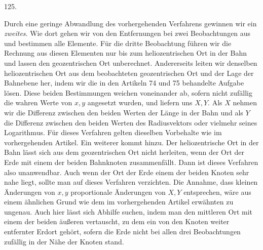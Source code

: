 \par{}\medskip
\begin{center}\hypertarget{native-172-article125}{}125.\end{center}
Durch eine geringe Abwandlung des vorhergehenden Verfahrens gewinnen wir ein \emph{zweites}. Wie dort gehen wir von den Entfernungen bei zwei Beobachtungen aus und bestimmen alle Elemente. Für die dritte Beobachtung führen wir die Rechnung aus diesen Elementen nur bis zum heliozentrischen Ort in der Bahn und lassen den geozentrischen Ort unberechnet. Andererseits leiten wir denselben heliozentrischen Ort aus dem beobachteten geozentrischen Ort und der Lage der Bahnebene her, indem wir die in den Artikeln 74 und 75 behandelte Aufgabe lösen. Diese beiden Bestimmungen weichen voneinander ab, sofern nicht zufällig die wahren Werte von $x,y$ angesetzt wurden, und liefern uns $X,Y$. Als $X$ nehmen wir die Differenz zwischen den beiden Werten der Länge in der Bahn und als $Y$ die Differenz zwischen den beiden Werten des Radiusvektors oder vielmehr seines Logarithmus. Für dieses Verfahren gelten dieselben Vorbehalte wie im vorhergehenden Artikel. Ein weiterer kommt hinzu. Der heliozentrische Ort in der Bahn lässt sich aus dem geozentrischen Ort nicht herleiten, wenn der Ort der Erde mit einem der beiden Bahnknoten zusammenfällt. Dann ist dieses Verfahren also unanwendbar. Auch wenn der Ort der Erde einem der beiden Knoten sehr nahe liegt, sollte man auf dieses Verfahren verzichten. Die Annahme, dass kleinen Änderungen von $x,y$ proportionale Änderungen von $X,Y$ entsprechen, wäre aus einem ähnlichen Grund wie dem im vorhergehenden Artikel erwähnten zu ungenau. Auch hier lässt sich Abhilfe suchen, indem man den mittleren Ort mit einem der beiden äußeren vertauscht, zu dem ein von den Knoten weiter entfernter Erdort gehört, sofern die Erde nicht bei allen drei Beobachtungen zufällig in der Nähe der Knoten stand.
